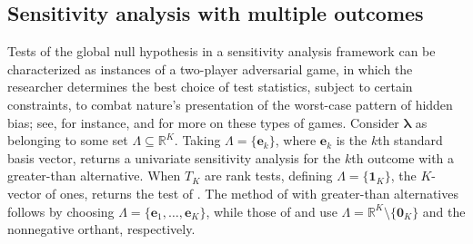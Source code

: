 \documentclass[12pt,leqno,titlepage]{amsart}
\newcommand{\1}{\mathbbm{1}}
\begin{document}
\begin{bibunit}
\subsection{Sensitivity analysis with multiple outcomes}

Tests of the global null hypothesis in a sensitivity analysis framework can be characterized as instances of a two-player adversarial game, in which the researcher determines the best choice of test statistics, subject to certain constraints, to combat nature’s presentation of the worst-case pattern of hidden bias; see, for instance, \cite{intriligator2002mathematical} and
\cite{yu2002competition} for more on these types of games.
Consider $\boldsymbol{\lambda}$ as belonging to some set $\Lambda \subseteq \mathbb{R}^K$. Taking $\Lambda = \{\mathbf{e}_k\}$, where $\mathbf{e}_k$ is the $k$th standard basis vector, returns a univariate sensitivity analysis for the $k$th outcome with a greater-than alternative. 
When $T_K$ are rank tests, defining $\Lambda = \{\mathbf{1}_K\}$, the $K$-vector of ones, returns the test of \cite{rosenbaum1997signed}. The method of \cite{fogarty2016sensitivity} with greater-than alternatives follows by choosing $\Lambda = \{\textbf{e}_1, \ldots, \textbf{e}_K\}$,
while those of \cite{rosenbaum2016using} and
\cite{cohen2020multivariate} use $\Lambda =\mathbb{R}^K \setminus\{\mathbf{0}_K\}$ and the nonnegative orthant, respectively.


\end{bibunit}
\end{document}

